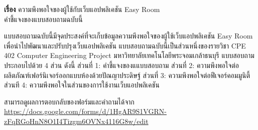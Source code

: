 \documentclass[12pt,oneside,openright,a4paper]{cpe-thai-project}
\begin{document}
\textbf{เรื่อง} ความพึงพอใจของผู้ใช้กับเว็บแอปพลิเคชัน Easy Room \\

\hspace {18pt} คำชี้แจงของแบบสอบถามฉบับนี้

\hspace {18pt}แบบสอบถามฉบับนี้มีจุดประสงค์ที่จะเก็บข้อมูลความพึงพอใจของผู้ใช้เว็บแอปพลิเคชัน Easy Room เพื่อนำไปพัฒนาและปรับปรุงเว็บแอปพลิเคชัน
แบบสอบถามฉบับนี้เป็นส่วนหนึ่งของรายวิชา CPE 402 Computer Engineering Project มหาวิทยาลัยเทคโนโลยีพระจอมเกล้าธนบุรี
แบบสอบถามประกอบไปด้วย 4 ส่วน ดังนี้
ส่วนที่ 1: คำชี้แจงของแแบบสอบถาม
ส่วนที่ 2: ความพึงพอใจต่อผลิตภัณฑ์เฟอร์นิเจอร์ออกแบบห้องด้วยปัณญาประดิษฐ์
ส่วนที่ 3: ความพึงพอใจต่อฟีเจอร์คอมมูนิตี้
ส่วนที 4: ความพึงพอใจในส่วนของการใช้งานเว็บแอปพลิเคชัน

สามารถดูผลการตอบกลับของฟอร์มและคำถามได้จาก \url{https://docs.google.com/forms/d/1HgAR9S1VGRN-zFqRGoHnN8O1I4Tizgm6OVNx4116G8w/edit}

\end{document}
